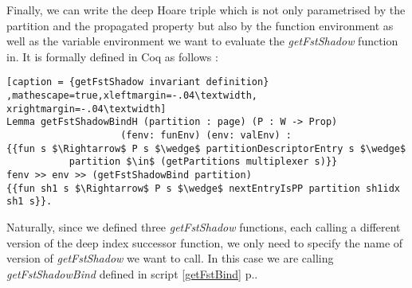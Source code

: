 Finally, we can write the deep Hoare triple which is not only parametrised by the partition and the propagated property but also by the function environment as well as the variable environment we want to evaluate the \textit{getFstShadow} function in. It is formally defined in Coq as follows : 
\begin{lstlisting}[caption = {getFstShadow invariant definition} ,mathescape=true,xleftmargin=-.04\textwidth,
xrightmargin=-.04\textwidth]
Lemma getFstShadowBindH (partition : page) (P : W -> Prop) 
	                (fenv: funEnv) (env: valEnv) :
{{fun s $\Rightarrow$ P s $\wedge$ partitionDescriptorEntry s $\wedge$ 
           partition $\in$ (getPartitions multiplexer s)}}
fenv >> env >> (getFstShadowBind partition) 
{{fun sh1 s $\Rightarrow$ P s $\wedge$ nextEntryIsPP partition sh1idx sh1 s}}.
\end{lstlisting} \vspace{4pt}
Naturally, since we defined three \textit{getFstShadow} functions, each calling a different version of the deep index successor function, we only need to specify the name of version of \textit{getFstShadow} we want to  call. In this case we are calling \textit{getFstShadowBind} defined in script \ref{getFstBind} p.\pageref{getFstBind}.


